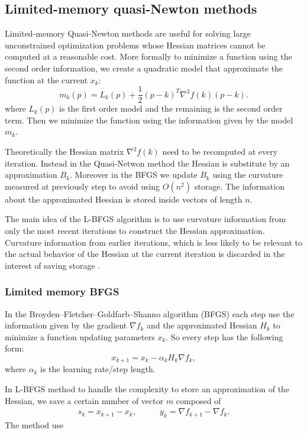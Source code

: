 \subsection{Limited-memory quasi-Newton methods}
Limited-memory Quasi-Newton methods are useful for solving large unconstrained optimization problems whose Hessian matrices cannot be computed at a reasonable cost. More formally to minimize a function using the second order information, we create a quadratic model that approximate the function at the current $x_{k}$:
\begin{equation}
m_{k}(p)=L_{k}(p)+ \frac{1}{2}(p-k)^T\nabla^2 f(k)(p-k).
\end{equation}
where $L_{k}(p)$ is the first order model and the remaining is the second order term. Then we minimize the function using the information given by the model $m_{k}$.

Theoretically  the Hessian matrix $\nabla^2 f(k)$ need to be recomputed at every iteration. Instead in the Quasi-Netwon method the Hessian is substitute by an approximation $B_{k}$. Moreover in the BFGS we update $B_{k}$ using the curvature measured at previously step to avoid using $O(n^2)$ storage. The information about the approximated Hessian is stored inside vectors of length $n$. 

The main idea of the L-BFGS algorithm is to use curvature information from only the most recent iterations to construct the Hessian approximation. Curvature information from earlier iterations, which is less likely to be relevant to the actual behavior of the Hessian at the current iteration is discarded in the interest of saving storage \cite{numerical}.

\subsubsection{Limited memory BFGS}
In the Broyden–Fletcher–Goldfarb–Shanno algorithm (BFGS) each step use the information given by the gradient $\nabla f_{k}$ and the approximated Hessian $H_{k}$ to minimize  a function updating parameters $x_{k}$. 
So every step has the following form: 
\begin{equation}
\label{stepBFGS}
x_{k+1}=x_{k}-\alpha_{k}H_{k}\nabla f_{k},
\end{equation}
where $\alpha_{k}$ is the learning rate/step length.

In L-BFGS method to handle the complexity to store an approximation of the Hessian, we save a certain number of vector $m$ composed of 
\begin{align}
s_{k}=x_{k+1}-x_{k}, & \qquad
y_{k}=\nabla f_{k+1} - \nabla f_{k}.
\end{align}
The method use 

